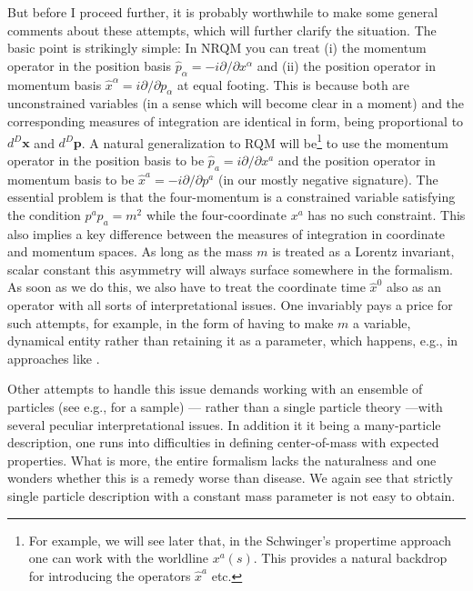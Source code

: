 \documentclass[12pt]{article}
\begin{document}
But before I proceed further, it is probably worthwhile to make some general comments about these attempts, which will further clarify the situation. The basic point is strikingly simple: In NRQM you can treat (i) the momentum operator in the position basis $\hat p_\alpha=-i\partial/\partial x^\alpha$ and (ii) the position operator in momentum basis $\hat x^\alpha=i\partial/\partial p_\alpha$ at equal footing. This is because both are unconstrained variables (in a sense which will become clear in a moment) and the corresponding measures of integration are identical in form, being proportional to $d^D\bm{x}$ and $d^D\bm{p}$. A natural generalization to RQM will be\footnote{For example, we will see later that, in the Schwinger's propertime approach one can work with the worldline $x^a(s)$. This provides a natural backdrop for introducing  the operators $\hat x^a$ etc.} to use the momentum operator in the position basis to be $\hat p_a=i\partial/\partial x^a$ and  the position operator in momentum basis to be $\hat x^a=-i\partial/\partial p^a$ (in our mostly negative signature). The essential problem is that the four-momentum is a constrained variable satisfying the condition $p^ap_a=m^2$ while the four-coordinate $x^a$ has no such constraint. This also implies a key difference between the measures of integration in coordinate and momentum spaces. As long as the mass $m$ is treated as a Lorentz invariant, scalar constant this asymmetry will always surface somewhere in the formalism.
As soon as we do this, we also have to treat the coordinate time $\hat x^0$ also as an operator with all sorts of interpretational issues. 
One invariably pays a price for such attempts, for example, in the form of having to make $m$ a variable, dynamical entity rather than retaining it as a parameter, which happens, e.g., in approaches like \cite{horwitz}.

Other attempts to handle this issue demands working with an ensemble of particles (see e.g., \cite{many1,many2} for a sample) --- rather than a single particle theory ---with several peculiar interpretational issues. In addition it it being a many-particle description, one runs into difficulties in defining center-of-mass with expected properties. What is more, the entire formalism lacks the naturalness and one wonders whether this is a remedy worse than disease. We again see that strictly single particle description with a constant mass parameter is not easy to obtain.
\end{document}
